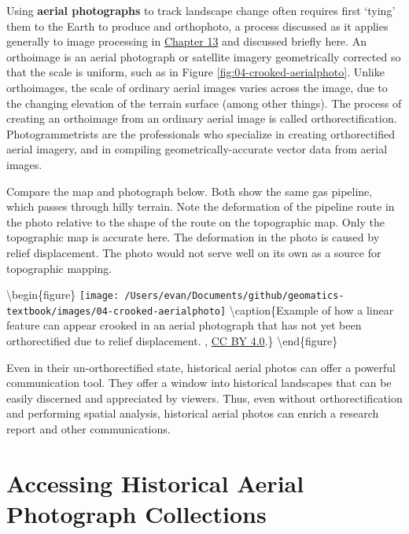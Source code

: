 \documentclass[
]{book}
\begin{document}
Using \textbf{aerial photographs} to track landscape change often requires first `tying' them to the Earth to produce and orthophoto, a process discussed as it applies generally to image processing in \href{https://ubc-geomatics-textbook.github.io/geomatics-textbook/image-processing.html}{Chapter 13} and discussed briefly here. An orthoimage is an aerial photograph or satellite imagery geometrically corrected so that the scale is uniform, such as in Figure \ref{fig:04-crooked-aerialphoto}. Unlike orthoimages, the scale of ordinary aerial images varies across the image, due to the changing elevation of the terrain surface (among other things). The process of creating an orthoimage from an ordinary aerial image is called orthorectification. Photogrammetrists are the professionals who specialize in creating orthorectified aerial imagery, and in compiling geometrically-accurate vector data from aerial images.

Compare the map and photograph below. Both show the same gas pipeline, which passes through hilly terrain. Note the deformation of the pipeline route in the photo relative to the shape of the route on the topographic map. Only the topographic map is accurate here. The deformation in the photo is caused by relief displacement. The photo would not serve well on its own as a source for topographic mapping.

\textbackslash begin\{figure\}
\texttt{[image: /Users/evan/Documents/github/geomatics-textbook/images/04-crooked-aerialphoto]} \textbackslash caption\{Example of how a linear feature can appear crooked in an aerial photograph that has not yet been orthorectified due to relief displacement. \citet{dibiase_census_2014}, \href{https://creativecommons.org/licenses/by/4.0/}{CC BY 4.0}.\}\label{fig:04-crooked-aerialphoto}
\textbackslash end\{figure\}

Even in their un-orthorectified state, historical aerial photos can offer a powerful communication tool. They offer a window into historical landscapes that can be easily discerned and appreciated by viewers. Thus, even without orthorectification and performing spatial analysis, historical aerial photos can enrich a research report and other communications.

\hypertarget{accessing-historical-aerial-photograph-collections}{%
\section{Accessing Historical Aerial Photograph Collections}\label{accessing-historical-aerial-photograph-collections}}
\end{document}
